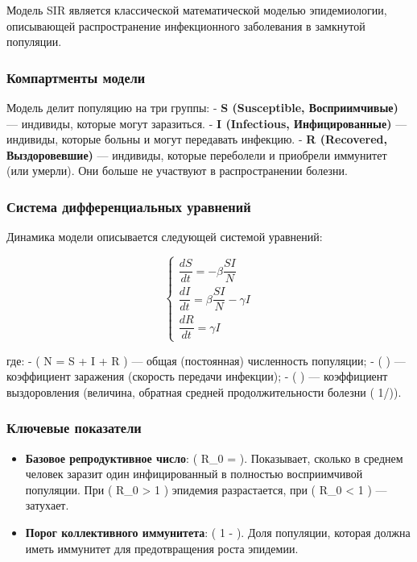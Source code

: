 \documentclass[
  letterpaper,
  DIV=11,
  numbers=noendperiod]{scrartcl}
\providecommand{\tightlist}{%
  \setlength{\itemsep}{0pt}\setlength{\parskip}{0pt}}\usepackage{longtable,booktabs,array}
\begin{document}
Модель SIR является классической математической моделью эпидемиологии,
описывающей распространение инфекционного заболевания в замкнутой
популяции.

\subsubsection{Компартменты
модели}\label{ux43aux43eux43cux43fux430ux440ux442ux43cux435ux43dux442ux44b-ux43cux43eux434ux435ux43bux438}

Модель делит популяцию на три группы: - \textbf{S (Susceptible,
Восприимчивые)} --- индивиды, которые могут заразиться. - \textbf{I
(Infectious, Инфицированные)} --- индивиды, которые больны и могут
передавать инфекцию. - \textbf{R (Recovered, Выздоровевшие)} ---
индивиды, которые переболели и приобрели иммунитет (или умерли). Они
больше не участвуют в распространении болезни.

\subsubsection{Система дифференциальных
уравнений}\label{ux441ux438ux441ux442ux435ux43cux430-ux434ux438ux444ux444ux435ux440ux435ux43dux446ux438ux430ux43bux44cux43dux44bux445-ux443ux440ux430ux432ux43dux435ux43dux438ux439}

Динамика модели описывается следующей системой уравнений:

\[
\begin{cases}
\dfrac{dS}{dt} = -\beta \dfrac{S I}{N} \\[1em]
\dfrac{dI}{dt} = \beta \dfrac{S I}{N} - \gamma I \\[1em]
\dfrac{dR}{dt} = \gamma I
\end{cases}
\]

где: - ( N = S + I + R ) --- общая (постоянная) численность популяции; -
( \beta ) --- коэффициент заражения (скорость передачи инфекции); - (
\gamma ) --- коэффициент выздоровления (величина, обратная средней
продолжительности болезни ( 1/\gamma )).

\subsubsection{Ключевые
показатели}\label{ux43aux43bux44eux447ux435ux432ux44bux435-ux43fux43eux43aux430ux437ux430ux442ux435ux43bux438}

\begin{itemize}
\tightlist
\item
  \textbf{Базовое репродуктивное число}: ( R\_0 = \dfrac{\beta}{\gamma}
  ). Показывает, сколько в среднем человек заразит один инфицированный в
  полностью восприимчивой популяции. При ( R\_0 \textgreater{} 1 )
  эпидемия разрастается, при ( R\_0 \textless{} 1 ) --- затухает.
\item
  \textbf{Порог коллективного иммунитета}: ( 1 -  ). Доля
  популяции, которая должна иметь иммунитет для предотвращения роста
  эпидемии.
\end{itemize}
\end{document}

